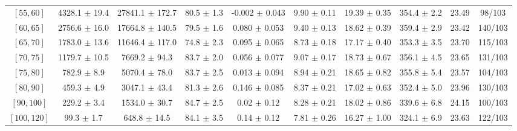 \begin{tabular}{c||c|c|c|c|c|c|c||c|c}
$[55, 60]$ & 4328.1 $\pm$ 19.4 & 27841.1 $\pm$ 172.7 & 80.5 $\pm$ 1.3 & -0.002 $\pm$ 0.043 & 9.90 $\pm$ 0.11 & 19.39 $\pm$ 0.35 & 354.4 $\pm$ 2.2 & 23.49 & 98/103\\
$[60, 65]$ & 2756.6 $\pm$ 16.0 & 17664.8 $\pm$ 140.5 & 79.5 $\pm$ 1.6 & 0.080 $\pm$ 0.053 & 9.40 $\pm$ 0.13 & 18.62 $\pm$ 0.39 & 359.4 $\pm$ 2.9 & 23.42 & 140/103\\
$[65, 70]$ & 1783.0 $\pm$ 13.6 & 11646.4 $\pm$ 117.0 & 74.8 $\pm$ 2.3 & 0.095 $\pm$ 0.065 & 8.73 $\pm$ 0.18 & 17.17 $\pm$ 0.40 & 353.3 $\pm$ 3.5 & 23.70 & 115/103\\
$[70, 75]$ & 1179.7 $\pm$ 10.5 & 7669.2 $\pm$ 94.3 & 83.7 $\pm$ 2.0 & 0.056 $\pm$ 0.077 & 9.07 $\pm$ 0.17 & 18.73 $\pm$ 0.67 & 356.1 $\pm$ 4.5 & 23.65 & 131/103\\
$[75, 80]$ & 782.9 $\pm$ 8.9 & 5070.4 $\pm$ 78.0 & 83.7 $\pm$ 2.5 & 0.013 $\pm$ 0.094 & 8.94 $\pm$ 0.21 & 18.65 $\pm$ 0.82 & 355.8 $\pm$ 5.4 & 23.57 & 104/103\\
$[80, 90]$ & 459.3 $\pm$ 4.9 & 3047.1 $\pm$ 43.4 & 81.3 $\pm$ 2.6 & 0.146 $\pm$ 0.085 & 8.37 $\pm$ 0.21 & 17.02 $\pm$ 0.63 & 352.4 $\pm$ 5.0 & 23.96 & 130/103\\
$[90, 100]$ & 229.2 $\pm$ 3.4 & 1534.0 $\pm$ 30.7 & 84.7 $\pm$ 2.5 & 0.02 $\pm$ 0.12 & 8.28 $\pm$ 0.21 & 18.02 $\pm$ 0.86 & 339.6 $\pm$ 6.8 & 24.15 & 100/103\\
$[100, 120]$ & 99.3 $\pm$ 1.7 & 648.8 $\pm$ 14.5 & 84.1 $\pm$ 3.5 & 0.14 $\pm$ 0.12 & 7.81 $\pm$ 0.26 & 16.27 $\pm$ 1.00 & 324.1 $\pm$ 6.9 & 23.63 & 122/103\\
\end{tabular}
